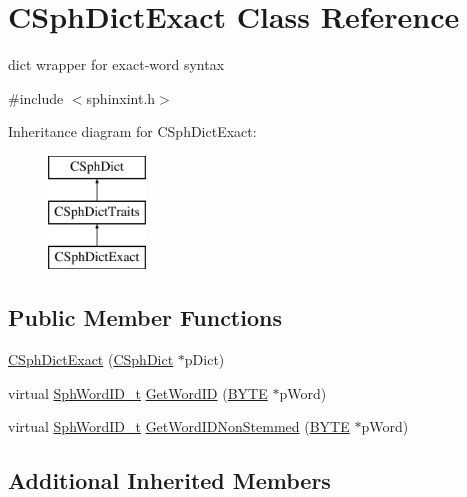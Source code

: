\hypertarget{classCSphDictExact}{\section{C\-Sph\-Dict\-Exact Class Reference}
\label{classCSphDictExact}
}


dict wrapper for exact-\/word syntax  




{\ttfamily \#include $<$sphinxint.\-h$>$}

Inheritance diagram for C\-Sph\-Dict\-Exact\-:\begin{figure}[H]
\begin{center}
\leavevmode
\includegraphics[height=3.000000cm]{classCSphDictExact}
\end{center}
\end{figure}
\subsection*{Public Member Functions}
\begin{DoxyCompactItemize}
\item 
\hyperlink{classCSphDictExact_aab5351031ed21007dae8478d889d8aaf}{C\-Sph\-Dict\-Exact} (\hyperlink{classCSphDict}{C\-Sph\-Dict} $\ast$p\-Dict)
\item 
virtual \hyperlink{sphinx_8h_a80a94d5984fdf9214a98f3e5e65df963}{Sph\-Word\-I\-D\-\_\-t} \hyperlink{classCSphDictExact_a3b9adf28ae5fa1dae004b3261df2e240}{Get\-Word\-I\-D} (\hyperlink{sphinxstd_8h_a4ae1dab0fb4b072a66584546209e7d58}{B\-Y\-T\-E} $\ast$p\-Word)
\item 
virtual \hyperlink{sphinx_8h_a80a94d5984fdf9214a98f3e5e65df963}{Sph\-Word\-I\-D\-\_\-t} \hyperlink{classCSphDictExact_a1da157b477a11bbc258660e892b934c4}{Get\-Word\-I\-D\-Non\-Stemmed} (\hyperlink{sphinxstd_8h_a4ae1dab0fb4b072a66584546209e7d58}{B\-Y\-T\-E} $\ast$p\-Word)
\end{DoxyCompactItemize}
\subsection*{Additional Inherited Members}


